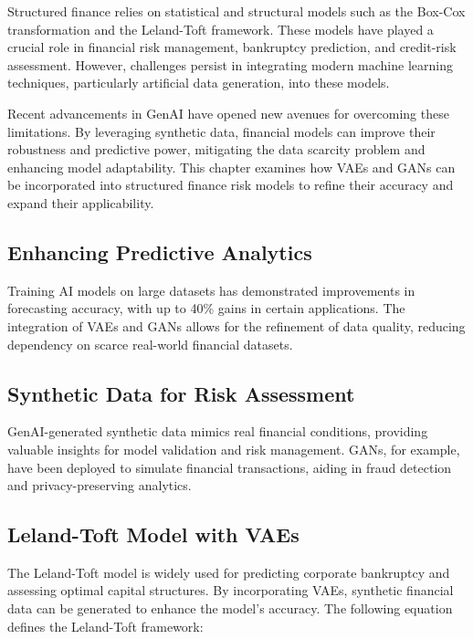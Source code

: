 \documentclass[a4paper,headinclude=on,footinclude=on,12pt,oneside]{scrbook}
\begin{document}
	Structured finance relies on statistical and structural models such as the Box-Cox transformation and the Leland-Toft framework. These models have played a crucial role in financial risk management, bankruptcy prediction, and credit-risk assessment. However, challenges persist in integrating modern machine learning techniques, particularly artificial data generation, into these models. 
	
	Recent advancements in GenAI have opened new avenues for overcoming these limitations. By leveraging synthetic data, financial models can improve their robustness and predictive power, mitigating the data scarcity problem and enhancing model adaptability. This chapter examines how VAEs and GANs can be incorporated into structured finance risk models to refine their accuracy and expand their applicability.
	
	
	\subsection{Enhancing Predictive Analytics}
	Training AI models on large datasets has demonstrated improvements in forecasting accuracy, with up to 40\% gains in certain applications. The integration of VAEs and GANs allows for the refinement of data quality, reducing dependency on scarce real-world financial datasets.
	
	\subsection{Synthetic Data for Risk Assessment}
	GenAI-generated synthetic data mimics real financial conditions, providing valuable insights for model validation and risk management. GANs, for example, have been deployed to simulate financial transactions, aiding in fraud detection and privacy-preserving analytics.
	
	
	\subsection{Leland-Toft Model with VAEs}
	The Leland-Toft model is widely used for predicting corporate bankruptcy and assessing optimal capital structures. By incorporating VAEs, synthetic financial data can be generated to enhance the model’s accuracy. The following equation defines the Leland-Toft framework:
	
\end{document}
